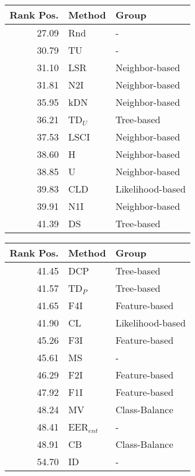\begin{tabular}{rll}
\toprule
Rank Pos. & Method & Group \\
\midrule
27.09 & Rnd & - \\
30.79 & TU & - \\
31.10 & LSR & Neighbor-based \\
31.81 & N2I & Neighbor-based \\
35.95 & kDN & Neighbor-based \\
36.21 & TD$_U$ & Tree-based \\
37.53 & LSCI & Neighbor-based \\
38.60 & H & Neighbor-based \\
38.85 & U & Neighbor-based \\
39.83 & CLD & Likelihood-based \\
39.91 & N1I & Neighbor-based \\
41.39 & DS & Tree-based \\
\bottomrule
\end{tabular}
\begin{tabular}{rll}
\toprule
Rank Pos. & Method & Group \\
\midrule
41.45 & DCP & Tree-based \\
41.57 & TD$_P$ & Tree-based \\
41.65 & F4I & Feature-based \\
41.90 & CL & Likelihood-based \\
45.26 & F3I & Feature-based \\
45.61 & MS & - \\
46.29 & F2I & Feature-based \\
47.92 & F1I & Feature-based \\
48.24 & MV & Class-Balance \\
48.41 & EER$_{ent}$ & - \\
48.91 & CB & Class-Balance \\
54.70 & ID & - \\
\bottomrule
\end{tabular}
